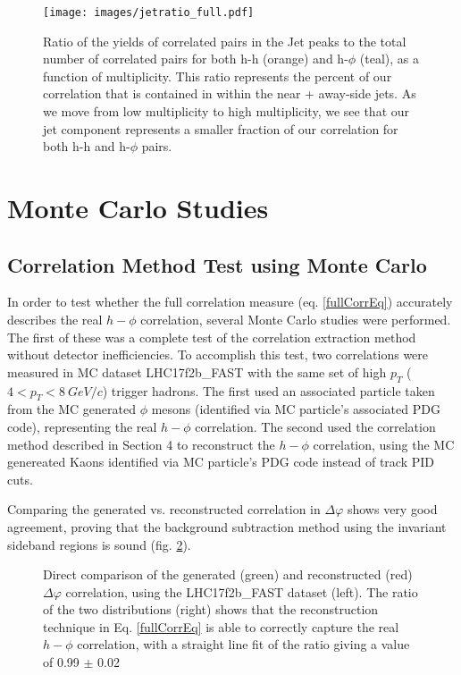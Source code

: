 \documentclass[ALICE,manyauthors]{ALICE_analysis_notes}
\begin{document}
\begin{figure}[ht]
\centering
\texttt{[image: images/jetratio\_full.pdf]}
\caption{Ratio of the yields of correlated pairs in the Jet peaks to the total number of correlated pairs for both h-h (orange) and h-$\phi$ (teal), as a function of multiplicity.  This ratio represents the percent of our correlation that is contained in within the near + away-side jets. As we move from low multiplicity to high multiplicity, we see that our jet component represents a smaller fraction of our correlation for both h-h and h-$\phi$ pairs.}
\label{jetratiofull}
\end{figure}

\section{Monte Carlo Studies}

\subsection{Correlation Method Test using Monte Carlo}

In order to test whether the full correlation measure (eq. \ref{fullCorrEq}) accurately describes the real $h-\phi$ correlation, several Monte Carlo studies were performed.  The first of these was a complete test of the correlation extraction method without detector inefficiencies.  To accomplish this test, two correlations were measured in MC dataset LHC17f2b\_FAST with the same set of high $p_T$ ($4 < p_T < \SI{8}{GeV/c}$) trigger hadrons.  The first used an associated particle taken from the MC generated $\phi$ mesons (identified via MC particle's associated PDG code), representing the real $h-\phi$ correlation. The second used the correlation method described in Section 4 to reconstruct the $h-\phi$ correlation, using the MC genereated Kaons identified via MC particle's PDG code instead of track PID cuts.

Comparing the generated vs. reconstructed correlation in $\Delta\varphi$ shows very good agreement, proving that the background subtraction method using the invariant sideband regions is sound (fig. \ref{methodtestFAST}).

\begin{figure}[ht]
\centering
\begin{subfigure}{
\texttt{[image: images/truevsmethod.pdf]}}
\end{subfigure}
\begin{subfigure}{
\texttt{[image: images/ratio\_method-true\_fit.pdf]}}
\end{subfigure}
\caption{Direct comparison of the generated (green) and reconstructed (red) $\Delta\varphi$ correlation, using the LHC17f2b\_FAST dataset (left). The ratio of the two distributions (right) shows that the reconstruction technique in Eq. \ref{fullCorrEq} is able to correctly capture the real $h-\phi$ correlation, with a straight line fit of the ratio giving a value of 0.99 $\pm$ 0.02}
\label{methodtestFAST}
\end{figure}
\end{document}
